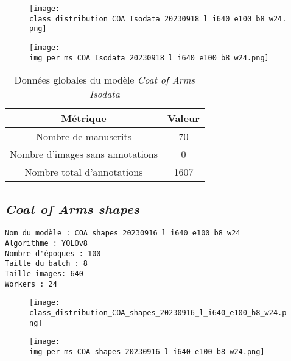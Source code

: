 \documentclass[12pt,twoside]{book}
\begin{document}
\begin{figure}[ht]
    \centering
    \begin{minipage}[b]{0.45\textwidth}
        \centering
        \texttt{[image: class\_distribution\_COA\_Isodata\_20230918\_l\_i640\_e100\_b8\_w24.png]}
    \end{minipage}
    \hfill
    \begin{minipage}[b]{0.45\textwidth}
        \centering
        \texttt{[image: img\_per\_ms\_COA\_Isodata\_20230918\_l\_i640\_e100\_b8\_w24.png]}
    \end{minipage}
\end{figure}

\begin{center}
\begin{table}[ht]
    \centering
    \caption{Données globales du modèle \textit{Coat of Arms Isodata}}
    \begin{tabular}{|c|c|}
    \hline
    \textbf{Métrique} & \textbf{Valeur} \\
    \hline
    Nombre de manuscrits & 70 \\ 
    \hline
    Nombre d'images sans annotations & 0 \\ 
    \hline
    Nombre total d'annotations & 1607 \\ 
    \hline
    \end{tabular}
\end{table}    
\end{center}


\newpage
\subsection{\textit{Coat of Arms shapes}}

\begin{verbatim}
Nom du modèle : COA_shapes_20230916_l_i640_e100_b8_w24
Algorithme : YOLOv8
Nombre d'époques : 100
Taille du batch : 8
Taille images: 640
Workers : 24
\end{verbatim}


\begin{figure}[ht]
    \centering
    \begin{minipage}[b]{0.45\textwidth}
        \centering
        \texttt{[image: class\_distribution\_COA\_shapes\_20230916\_l\_i640\_e100\_b8\_w24.png]}
    \end{minipage}
    \hfill
    \begin{minipage}[b]{0.45\textwidth}
        \centering
        \texttt{[image: img\_per\_ms\_COA\_shapes\_20230916\_l\_i640\_e100\_b8\_w24.png]}
    \end{minipage}
\end{figure}
\end{document}
